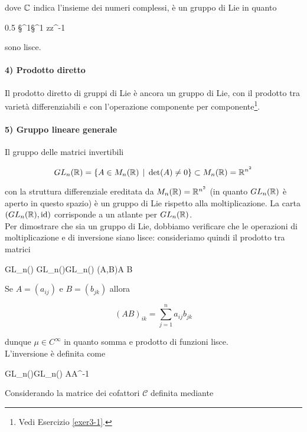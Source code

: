 dove $ \mathbb{C} $ indica l'insieme dei numeri complessi, è un gruppo di Lie in quanto

	{0.5}{%
				{\S^{1}}{\S^{1}}
				{z}{z^{-1}}
			}

sono lisce.

\paragraph{4) Prodotto diretto}

Il prodotto diretto di gruppi di Lie è ancora un gruppo di Lie, con il prodotto tra varietà differenziabili e con l'operazione componente per componente\footnote{%
	Vedi Esercizio \ref{exer3-1}.%
}.

\paragraph{5) Gruppo lineare generale}

Il gruppo delle matrici invertibili

\begin{equation}
	GL_{n}(\mathbb{R}) = \{ A \in M_{n}(\mathbb{R}) \, \mid \, \det(A) \neq 0 \} \subset M_{n}(\mathbb{R}) = \mathbb{R}^{n^{2}}
\end{equation}

con la struttura differenziale ereditata da $ M_{n}(\mathbb{R}) = \mathbb{R}^{n^{2}} $ (in quanto $ GL_{n}(\mathbb{R}) $ è aperto in questo spazio) è un gruppo di Lie rispetto alla moltiplicazione. La carta $ (GL_{n}(\mathbb{R}),\operatorname{id}) $ corrisponde a un atlante per $ GL_{n}(\mathbb{R}) $. \\
Per dimostrare che sia un gruppo di Lie, dobbiamo verificare che le operazioni di moltiplicazione e di inversione siano lisce: consideriamo quindi il prodotto tra matrici

\map{\mu}
	{GL_{n}(\R) \times GL_{n}(\R)}{GL_{n}(\R)}
	{(A,B)}{A B}

Se $ A = (a_{ij}) $ e $ B = (b_{jk}) $ allora

\begin{equation}
	(A B)_{ik} = \sum_{j=1}^{n} a_{ij} b_{jk}
\end{equation}

dunque $ \mu \in C^{\infty} $ in quanto somma e prodotto di funzioni lisce. \\
L'inversione è definita come

	{GL_{n}(\R)}{GL_{n}(\R)}
	{A}{A^{-1}}

Considerando la matrice dei cofattori $ \mathcal{C} $ definita mediante

